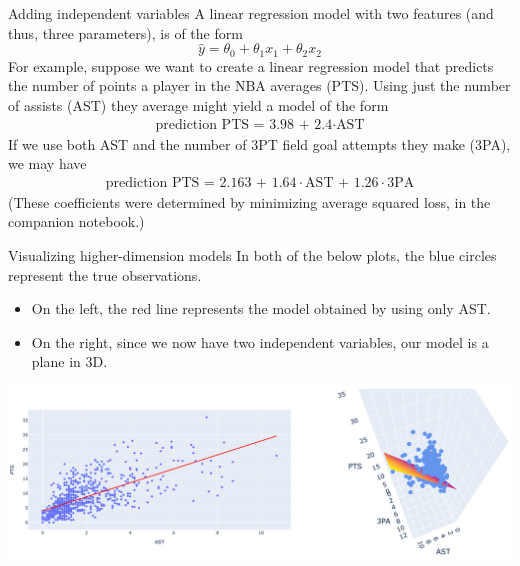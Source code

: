 \documentclass[aspectratio=169]{../latex_main/tntbeamer}  %
\begin{document}
	
	\begin{frame}{Adding independent variables}
	    A linear regression model with two features (and thus, three parameters), is of the form
        \begin{equation*}
            \hat{y} = \theta_0 + \theta_1x_1 + \theta_2x_2 
        \end{equation*}
        For example, suppose we want to create a linear regression model that predicts the number of points a player in the NBA averages (PTS). Using just the number of assists (AST) they average might yield a model of the form
        \begin{align*}
            \text{prediction PTS = 3.98 + 2.4} \cdot \text{AST}
        \end{align*}
        If we use both AST and the number of 3PT field goal attempts they make (3PA), we may have
        \begin{align*}
            \text{prediction PTS = 2.163 + 1.64} \cdot \text{AST + 1.26} \cdot 3\text{PA}
        \end{align*}
        (These coefficients were determined by minimizing average squared loss, in the companion notebook.)

	\end{frame}
	
	
	\begin{frame}{Visualizing higher-dimension models}
	    In both of the below plots, the blue circles represent the true observations. 
        \begin{itemize}
            \item On the left, the red line represents the model obtained by using only AST.
            \item On the right, since we now have two independent variables, our model is a plane in 3D.
        \end{itemize}
        \includegraphics[scale=.4]{Bild10}
	\end{frame}
	
	
	
\end{document}
